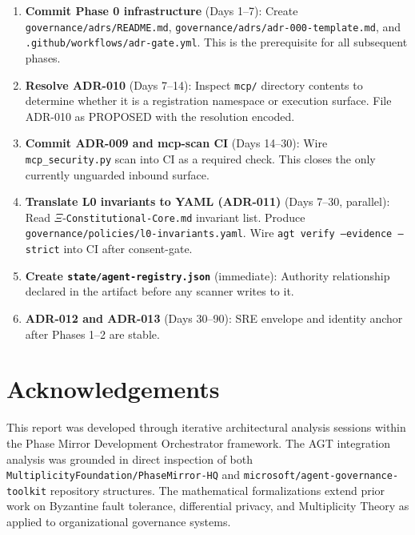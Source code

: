 \documentclass[12pt,a4paper]{article}
\theoremstyle{definition}
\theoremstyle{remark}
\begin{document}
\begin{enumerate}
  \item \textbf{Commit Phase 0 infrastructure} (Days 1--7):
    Create \texttt{governance/adrs/README.md},
    \texttt{governance/adrs/adr-000-template.md},
    and \texttt{.github/workflows/adr-gate.yml}.
    This is the prerequisite for all subsequent phases.

  \item \textbf{Resolve ADR-010} (Days 7--14):
    Inspect \texttt{mcp/} directory contents to determine whether it is a
    registration namespace or execution surface.
    File ADR-010 as PROPOSED with the resolution encoded.

  \item \textbf{Commit ADR-009 and mcp-scan CI} (Days 14--30):
    Wire \texttt{mcp\_security.py} scan into CI as a required check.
    This closes the only currently unguarded inbound surface.

  \item \textbf{Translate L0 invariants to YAML (ADR-011)} (Days 7--30, parallel):
    Read $\Xi$-\texttt{Constitutional-Core.md} invariant list.
    Produce \texttt{governance/policies/l0-invariants.yaml}.
    Wire \texttt{agt verify --evidence --strict} into CI after consent-gate.

  \item \textbf{Create \texttt{state/agent-registry.json}} (immediate):
    Authority relationship declared in the artifact before any scanner writes to it.

  \item \textbf{ADR-012 and ADR-013} (Days 30--90):
    SRE envelope and identity anchor after Phases 1--2 are stable.
\end{enumerate}


\section*{Acknowledgements}

This report was developed through iterative architectural analysis sessions
within the Phase Mirror Development Orchestrator framework. The AGT integration
analysis was grounded in direct inspection of both
\texttt{MultiplicityFoundation/PhaseMirror-HQ} and
\texttt{microsoft/agent-governance-toolkit} repository structures.
The mathematical formalizations extend prior work on Byzantine fault tolerance,
differential privacy, and Multiplicity Theory as applied to organizational
governance systems.
\end{document}
